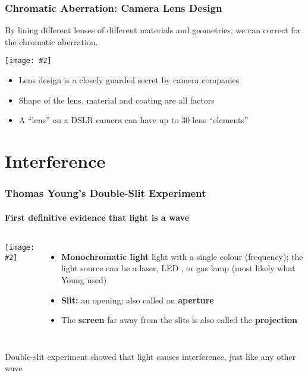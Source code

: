 \documentclass[compress,aspectratio=169]{beamer}
\newcommand{\pic}[2]{\texttt{[image: \#2]}}
\begin{document}
\begin{frame}
  \frametitle{Chromatic Aberration: Camera Lens Design}
  By lining different lenses of different materials and geometries, we can
  correct for the chromatic aberration.
  \begin{center}
    \pic{.5}{Apochromatic-Lens.png}
  \end{center}
  \begin{itemize}
  \item Lens design is a closely guarded secret by camera companies
  \item Shape of the lens, material and coating are all factors
  \item A ``lens'' on a DSLR camera can have up to 30 lens ``elements''
  \end{itemize}
\end{frame}


\section{Interference}

\begin{frame}
  \frametitle{Thomas Young's Double-Slit Experiment}
  \framesubtitle{First definitive evidence that light is a wave}
  \begin{columns}
    \pic{1}{double-slit1.png}
    \begin{itemize}
    \item\textbf{Monochromatic light} light with a single colour (frequency);
      the light source can be a laser, LED , or gas lamp (most likely what Young
      used)
    \item\textbf{Slit:} an opening; also called an \textbf{aperture}
    \item The \textbf{screen} far away from the slits is also called the
      \textbf{projection}
    \end{itemize}
  \end{columns}

  \vspace{.15in}Double-slit experiment showed that light causes interference,
  just like any other wave
\end{frame}
\end{document}
